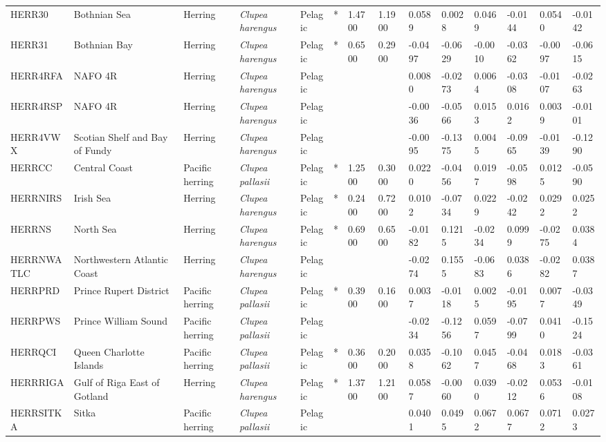 \begin{longtable}{p{2.6cm}p{1.9cm}p{1.7cm}p{1.6cm}p{1cm}p{0.3cm}p{1cm}p{1cm}p{1cm}p{1.1cm}p{1cm}p{1.1cm}p{1cm}p{1.1cm}}
  HERR30 & Bothnian Sea & Herring & \textit{Clupea harengus} & Pelagic & * & 1.4700 & 1.1900 & 0.0589 & 0.0028 & 0.0469 & -0.0144 & 0.0540 & -0.0142 \\ 
  HERR31 & Bothnian Bay & Herring & \textit{Clupea harengus} & Pelagic & * & 0.6500 & 0.2900 & -0.0497 & -0.0629 & -0.0010 & -0.0362 & -0.0097 & -0.0615 \\ 
  HERR4RFA & NAFO 4R & Herring & \textit{Clupea harengus} & Pelagic &  &  &  & 0.0080 & -0.0273 & 0.0064 & -0.0308 & -0.0107 & -0.0263 \\ 
  HERR4RSP & NAFO 4R & Herring & \textit{Clupea harengus} & Pelagic &  &  &  & -0.0036 & -0.0566 & 0.0153 & 0.0162 & 0.0039 & -0.0101 \\ 
  HERR4VWX & Scotian Shelf and Bay of Fundy & Herring & \textit{Clupea harengus} & Pelagic &  &  &  & -0.0095 & -0.1375 & 0.0045 & -0.0965 & -0.0139 & -0.1290 \\ 
  HERRCC & Central Coast & Pacific herring & \textit{Clupea pallasii} & Pelagic & * & 1.2500 & 0.3000 & 0.0220 & -0.0456 & 0.0197 & -0.0598 & 0.0125 & -0.0590 \\ 
  HERRNIRS & Irish Sea & Herring & \textit{Clupea harengus} & Pelagic & * & 0.2400 & 0.7200 & 0.0102 & -0.0734 & 0.0229 & -0.0242 & 0.0292 & 0.0252 \\ 
  HERRNS & North Sea & Herring & \textit{Clupea harengus} & Pelagic & * & 0.6900 & 0.6500 & -0.0182 & 0.1215 & -0.0234 & 0.0999 & -0.0275 & 0.0384 \\ 
  HERRNWATLC & Northwestern Atlantic Coast & Herring & \textit{Clupea harengus} & Pelagic &  &  &  & -0.0274 & 0.1555 & -0.0683 & 0.0386 & -0.0282 & 0.0387 \\ 
  HERRPRD & Prince Rupert District & Pacific herring & \textit{Clupea pallasii} & Pelagic & * & 0.3900 & 0.1600 & 0.0037 & -0.0118 & 0.0025 & -0.0195 & 0.0077 & -0.0349 \\ 
  HERRPWS & Prince William Sound & Pacific herring & \textit{Clupea pallasii} & Pelagic &  &  &  & -0.0234 & -0.1256 & 0.0597 & -0.0799 & 0.0410 & -0.1524 \\ 
  HERRQCI & Queen Charlotte Islands & Pacific herring & \textit{Clupea pallasii} & Pelagic & * & 0.3600 & 0.2000 & 0.0358 & -0.1062 & 0.0457 & -0.0468 & 0.0183 & -0.0361 \\ 
  HERRRIGA & Gulf of Riga East of Gotland & Herring & \textit{Clupea harengus} & Pelagic & * & 1.3700 & 1.2100 & 0.0587 & -0.0060 & 0.0390 & -0.0212 & 0.0536 & -0.0108 \\ 
  HERRSITKA & Sitka & Pacific herring & \textit{Clupea pallasii} & Pelagic &  &  &  & 0.0401 & 0.0495 & 0.0672 & 0.0677 & 0.0712 & 0.0273 \\ 

\end{longtable}
